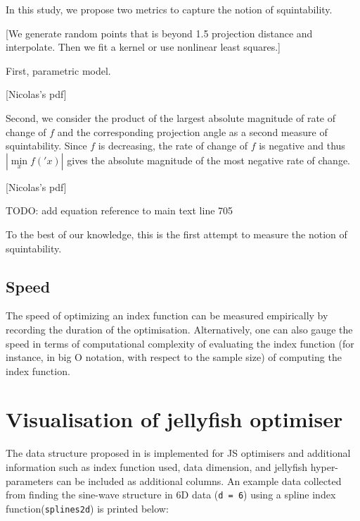 \documentclass[
  number,
  preprint,
  3p]{elsarticle}
\begin{document}
In this study, we propose two metrics to capture the notion of
squintability.

{[}We generate random points that is beyond 1.5 projection distance and
interpolate. Then we fit a kernel or use nonlinear least squares.{]}

First, parametric model.

{[}Nicolas's pdf{]}

Second, we consider the product of the largest absolute magnitude of
rate of change of \(f\) and the corresponding projection angle as a
second measure of squintability. Since \(f\) is decreasing, the rate of
change of \(f\) is negative and thus \(|\underset{x}{\min} f('x)|\)
gives the absolute magnitude of the most negative rate of change.

{[}Nicolas's pdf{]}

TODO: add equation reference to main text line 705

To the best of our knowledge, this is the first attempt to measure the
notion of squintability.

\hypertarget{speed}{%
\subsection{Speed}\label{speed}}

The speed of optimizing an index function can be measured empirically by
recording the duration of the optimisation. Alternatively, one can also
gauge the speed in terms of computational complexity of evaluating the
index function (for instance, in big O notation, with respect to the
sample size) of computing the index function.

\hypertarget{sec-vis}{%
\section{Visualisation of jellyfish optimiser}\label{sec-vis}}

The data structure proposed in \citet{RJ-2021-105} is implemented for JS
optimisers and additional information such as index function used, data
dimension, and jellyfish hyper-parameters can be included as additional
columns. An example data collected from finding the sine-wave structure
in 6D data (\texttt{d\ =\ 6}) using a spline index
function(\texttt{splines2d}) is printed below:
\end{document}
